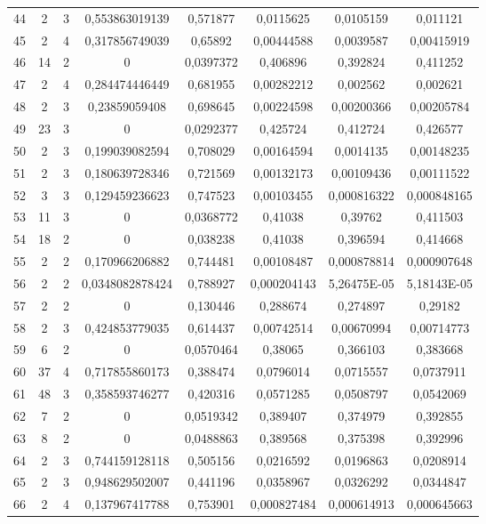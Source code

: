 \begin{longtable}{|c|c|c|c|c|c|c|c|}
44 & 2 & 3 & 0,553863019139 & 0,571877 & 0,0115625 & 0,0105159 & 0,011121  \\
45 & 2 & 4 & 0,317856749039 & 0,65892 & 0,00444588 & 0,0039587 & 0,00415919  \\
46 & 14 & 2 & 0 & 0,0397372 & 0,406896 & 0,392824 & 0,411252  \\
47 & 2 & 4 & 0,284474446449 & 0,681955 & 0,00282212 & 0,002562 & 0,002621  \\
48 & 2 & 3 & 0,23859059408 & 0,698645 & 0,00224598 & 0,00200366 & 0,00205784  \\
49 & 23 & 3 & 0 & 0,0292377 & 0,425724 & 0,412724 & 0,426577  \\
50 & 2 & 3 & 0,199039082594 & 0,708029 & 0,00164594 & 0,0014135 & 0,00148235  \\
51 & 2 & 3 & 0,180639728346 & 0,721569 & 0,00132173 & 0,00109436 & 0,00111522  \\
52 & 3 & 3 & 0,129459236623 & 0,747523 & 0,00103455 & 0,000816322 & 0,000848165  \\
53 & 11 & 3 & 0 & 0,0368772 & 0,41038 & 0,39762 & 0,411503  \\
54 & 18 & 2 & 0 & 0,038238 & 0,41038 & 0,396594 & 0,414668  \\
55 & 2 & 2 & 0,170966206882 & 0,744481 & 0,00108487 & 0,000878814 & 0,000907648  \\
56 & 2 & 2 & 0,0348082878424 & 0,788927 & 0,000204143 & 5,26475E-05 & 5,18143E-05  \\
57 & 2 & 2 & 0 & 0,130446 & 0,288674 & 0,274897 & 0,29182  \\
58 & 2 & 3 & 0,424853779035 & 0,614437 & 0,00742514 & 0,00670994 & 0,00714773  \\
59 & 6 & 2 & 0 & 0,0570464 & 0,38065 & 0,366103 & 0,383668  \\
60 & 37 & 4 & 0,717855860173 & 0,388474 & 0,0796014 & 0,0715557 & 0,0737911  \\
61 & 48 & 3 & 0,358593746277 & 0,420316 & 0,0571285 & 0,0508797 & 0,0542069  \\
62 & 7 & 2 & 0 & 0,0519342 & 0,389407 & 0,374979 & 0,392855  \\
63 & 8 & 2 & 0 & 0,0488863 & 0,389568 & 0,375398 & 0,392996  \\
64 & 2 & 3 & 0,744159128118 & 0,505156 & 0,0216592 & 0,0196863 & 0,0208914  \\
65 & 2 & 3 & 0,948629502007 & 0,441196 & 0,0358967 & 0,0326292 & 0,0344847  \\
66 & 2 & 4 & 0,137967417788 & 0,753901 & 0,000827484 & 0,000614913 & 0,000645663  \\

\end{longtable}
